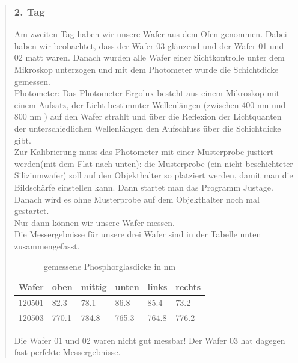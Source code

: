 \begin{quote}
    		\vspace{2em}
	
		\subsubsection{2. Tag}
		
		Am zweiten Tag haben wir unsere Wafer aus dem Ofen genommen. Dabei haben 
		wir beobachtet, dass der Wafer 03 glänzend und der Wafer 01 und 02 matt 
		waren. Danach wurden alle Wafer einer Sichtkontrolle unter dem Mikroskop 
		unterzogen und  mit dem Photometer wurde die Schichtdicke gemessen.\\

			Photometer: Das Photometer Ergolux besteht aus einem Mikroskop mit 
			einem  Aufsatz, der Licht bestimmter Wellenlängen (zwischen 400 nm 
			und 800 nm ) auf den Wafer strahlt und über die Reflexion der 
			Lichtquanten der unterschiedlichen Wellenlängen den Aufschluss über 
			die Schichtdicke gibt.\\

			Zur Kalibrierung muss das Photometer mit einer Musterprobe justiert 
			werden(mit dem Flat nach unten):  die Musterprobe (ein nicht 
			beschichteter Siliziumwafer) soll auf den Objekthalter so platziert 
			werden, damit man die Bildschärfe einstellen kann. Dann startet man 
			das Programm  Justage. Danach wird es ohne Musterprobe auf dem 
			Objekthalter noch mal gestartet.\\
			Nur dann  können wir unsere Wafer messen.\\

			Die Messergebnisse für unsere drei Wafer sind in der Tabelle unten 
			zusammengefasst.
			
			\vspace{2em}

      		\begin{table}[h]
     		  \begin{addmargin}[1cm]{3cm}
     			\centering
                    \begin{tabular}{|p{2cm}|p{2cm}|p{2cm}|p{2cm}|p{2cm}|p{2cm}|}
         			\hline
         			Wafer & oben & mittig & unten & links & rechts\\
         			\hline 
        			120501 & 82.3  & 78.1  & 86.8  & 85.4  & 73.2 \\
                    120503 & 770.1 & 784.8 & 765.3 & 764.8 & 776.2 \\
                    \hline
        
                    \end{tabular}
              \end{addmargin}
              \caption{gemessene Phosphorglasdicke in nm}
              \label{Phosphordicke}
            \end{table}

            \vspace{2em}
            
            Die Wafer 01 und 02 waren nicht gut messbar! Der Wafer 03  hat 
            dagegen fast perfekte Messergebnisse. 
			
\end{quote}
